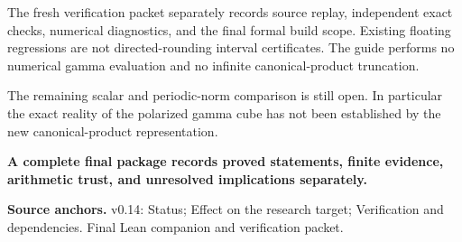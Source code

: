 \documentclass[11pt]{article}
\begin{document}
The fresh verification packet separately records source replay, independent exact checks, numerical diagnostics, and the final formal build scope. Existing floating regressions are not directed-rounding interval certificates. The guide performs no numerical gamma evaluation and no infinite canonical-product truncation.

The remaining scalar and periodic-norm comparison is still open. In particular the exact reality of the polarized gamma cube has not been established by the new canonical-product representation.

\begin{tcolorbox}[colback=pale,colframe=teal,boxrule=.4pt,arc=2pt,left=7pt,right=7pt,top=5pt,bottom=5pt]\small\bfseries A complete final package records proved statements, finite evidence, arithmetic trust, and unresolved implications separately.\end{tcolorbox}
\vfill{\footnotesize\color{navy}\textbf{Source anchors.} v0.14: Status; Effect on the research target; Verification and dependencies. Final Lean companion and verification packet.}
\end{document}
